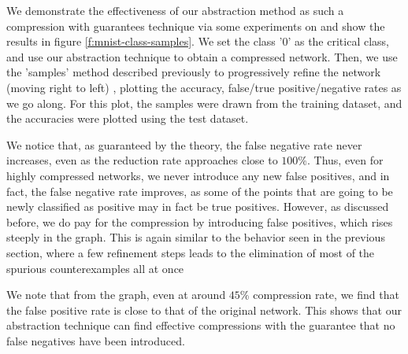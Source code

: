 We demonstrate the effectiveness of our abstraction method as such a compression
with guarantees technique via some experiments on \mnist and show the results in
figure \ref{f:mnist-class-samples}. We set the class '0'
as the critical class, and use our abstraction technique to obtain a compressed
network. Then, we use the 'samples' method described previously to progressively
refine the network (moving right to left) , plotting the accuracy, false/true
positive/negative rates as we go along. For this plot, the samples were drawn
from the \mnist training dataset, and the accuracies were plotted using the
\mnist test dataset.

We notice that, as guaranteed by the theory, the false negative rate never
increases, even as the reduction rate approaches close to $100\%$. Thus, even
for highly compressed networks, we never introduce any new false positives, and
in fact, the false negative rate improves, as some of the points that are going
to be newly classified as positive may in fact be true positives. However, as
discussed before, we do pay for the compression by introducing false positives,
which rises steeply in the graph. This is again similar to the behavior seen in
the previous section, where a few refinement steps leads to the elimination of
most of the spurious counterexamples all at once  

We note that from the graph, even at around $45\%$ compression rate,
we find that the false positive rate is close to that of the original network.
This shows that our abstraction technique can find effective compressions with
the guarantee that no false negatives have been introduced.
